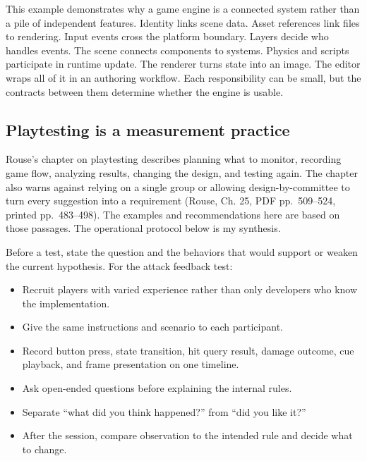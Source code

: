 This example demonstrates why a game engine is a connected system rather than a pile of independent features. Identity links scene data. Asset references link files to rendering. Input events cross the platform boundary. Layers decide who handles events. The scene connects components to systems. Physics and scripts participate in runtime update. The renderer turns state into an image. The editor wraps all of it in an authoring workflow. Each responsibility can be small, but the contracts between them determine whether the engine is usable.

\subsection{Playtesting is a measurement practice}\label{06-engine-ii-ch041-playtesting-is-a-measurement-practice}

\hypertarget{06-engine-ii-ch041-playtesting-is-a-measurement-practice}{}

Rouse's chapter on playtesting describes planning what to monitor, recording game flow, analyzing results, changing the design, and testing again. The chapter also warns against relying on a single group or allowing design-by-committee to turn every suggestion into a requirement (Rouse, Ch. 25, PDF pp.~509--524, printed pp.~483--498). The examples and recommendations here are based on those passages. The operational protocol below is my synthesis.

Before a test, state the question and the behaviors that would support or weaken the current hypothesis. For the attack feedback test:

\begin{itemize}
\tightlist
\item
  Recruit players with varied experience rather than only developers who know the implementation.
\item
  Give the same instructions and scenario to each participant.
\item
  Record button press, state transition, hit query result, damage outcome, cue playback, and frame presentation on one timeline.
\item
  Ask open-ended questions before explaining the internal rules.
\item
  Separate ``what did you think happened?'' from ``did you like it?''
\item
  After the session, compare observation to the intended rule and decide what to change.
\end{itemize}

